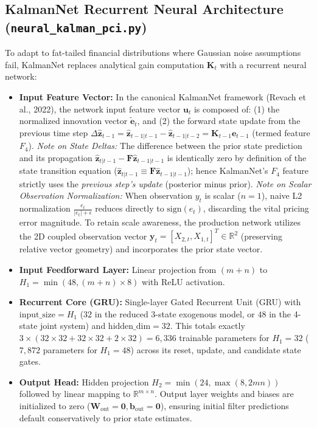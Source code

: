 \documentclass[11pt, a4paper]{article}
\begin{document}
\subsection{KalmanNet Recurrent Neural Architecture (\texttt{neural\_kalman\_pci.py})}
To adapt to fat-tailed financial distributions where Gaussian noise assumptions fail, KalmanNet replaces analytical gain computation $\mathbf{K}_t$ with a recurrent neural network:
\begin{itemize}
    \item \textbf{Input Feature Vector:} 
    In the canonical KalmanNet framework (Revach et al., 2022), the network input feature vector $\mathbf{u}_t$ is composed of:
    (1) the normalized innovation vector $\tilde{\mathbf{e}}_t$, and 
    (2) the forward state update from the previous time step $\Delta \hat{\mathbf{z}}_{t-1} = \hat{\mathbf{z}}_{t-1|t-1} - \hat{\mathbf{z}}_{t-1|t-2} = \mathbf{K}_{t-1} \mathbf{e}_{t-1}$ (termed feature $F_4$).
    \textit{Note on State Deltas:} The difference between the prior state prediction and its propagation $\hat{\mathbf{z}}_{t|t-1} - \mathbf{F}\hat{\mathbf{z}}_{t-1|t-1}$ is identically zero by definition of the state transition equation ($\hat{\mathbf{z}}_{t|t-1} \equiv \mathbf{F}\hat{\mathbf{z}}_{t-1|t-1}$); hence KalmanNet's $F_4$ feature strictly uses the \textit{previous step's update} (posterior minus prior).
    \textit{Note on Scalar Observation Normalization:} When observation $y_t$ is scalar ($n=1$), naive L2 normalization $\frac{e_t}{|e_t| + \epsilon}$ reduces directly to $\text{sign}(e_t)$, discarding the vital pricing error magnitude. To retain scale awareness, the production network utilizes the 2D coupled observation vector $\mathbf{y}_t = [X_{2,t}, X_{1,t}]^T \in \mathbb{R}^2$ (preserving relative vector geometry) and incorporates the prior state vector.
    \item \textbf{Input Feedforward Layer:} Linear projection from $(m+n)$ to $H_1 = \min(48, (m+n)\times 8)$ with ReLU activation.
    \item \textbf{Recurrent Core (GRU):} Single-layer Gated Recurrent Unit (GRU) with $\text{input\_size} = H_1$ ($32$ in the reduced 3-state exogenous model, or $48$ in the 4-state joint system) and $\text{hidden\_dim} = 32$. This totals exactly $3 \times (32 \times 32 + 32 \times 32 + 2 \times 32) = 6{,}336$ trainable parameters for $H_1=32$ ($7{,}872$ parameters for $H_1=48$) across its reset, update, and candidate state gates.
    \item \textbf{Output Head:} Hidden projection $H_2 = \min(24, \max(8, 2mn))$ followed by linear mapping to $\mathbb{R}^{m \times n}$. Output layer weights and biases are initialized to zero ($\mathbf{W}_{\text{out}} = \mathbf{0}, \mathbf{b}_{\text{out}} = \mathbf{0}$), ensuring initial filter predictions default conservatively to prior state estimates.
\end{itemize}
\end{document}
